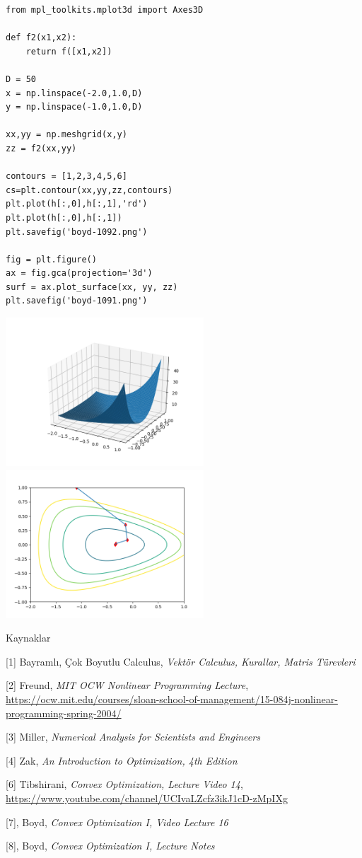 \documentclass[12pt,fleqn]{article}\usepackage{../../common}
\begin{document}
\begin{verbatim}
from mpl_toolkits.mplot3d import Axes3D

def f2(x1,x2):
    return f([x1,x2])

D = 50
x = np.linspace(-2.0,1.0,D)
y = np.linspace(-1.0,1.0,D)

xx,yy = np.meshgrid(x,y)
zz = f2(xx,yy)

contours = [1,2,3,4,5,6]
cs=plt.contour(xx,yy,zz,contours)
plt.plot(h[:,0],h[:,1],'rd')
plt.plot(h[:,0],h[:,1])
plt.savefig('boyd-1092.png')

fig = plt.figure()
ax = fig.gca(projection='3d')
surf = ax.plot_surface(xx, yy, zz)
plt.savefig('boyd-1091.png')
\end{verbatim}

\includegraphics[width=20em]{boyd-1091.png}
\includegraphics[width=20em]{boyd-1092.png}


Kaynaklar 

[1] Bayramlı, Çok Boyutlu Calculus, {\em Vektör Calculus, Kurallar, Matris Türevleri}

[2] Freund, {\em MIT OCW Nonlinear Programming Lecture},
    \url{https://ocw.mit.edu/courses/sloan-school-of-management/15-084j-nonlinear-programming-spring-2004/}

[3] Miller, {\em Numerical Analysis for Scientists and Engineers}

[4] Zak, {\em An Introduction to Optimization, 4th Edition}

[6] Tibshirani, {\em Convex Optimization, Lecture Video 14}, 
\url{https://www.youtube.com/channel/UCIvaLZcfz3ikJ1cD-zMpIXg}   

[7], Boyd, {\em Convex Optimization I, Video Lecture 16}

[8], Boyd, {\em Convex Optimization I, Lecture Notes}
\end{document}
